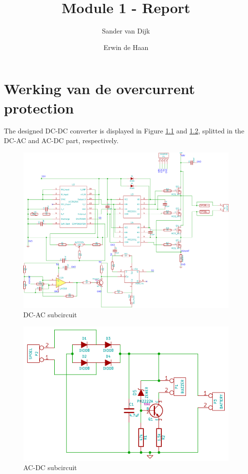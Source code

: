 \documentclass[final]{scrreprt} %
\title{Module 1 - Report}
\author{Sander {van Dijk} \and Erwin {de Haan}}
\begin{document}
\chapter{Werking van de overcurrent protection}
The designed DC-DC converter is displayed in Figure \ref{fig:DC-AC} and \ref{fig:AC-DC}, splitted in the DC-AC and AC-DC part, respectively.

\begin{figure}[h]
	\includegraphics[width=\linewidth]{resources/DC-AC-rc.pdf}
	\caption{DC-AC subcircuit}
	\label{fig:DC-AC}
\end{figure}

\begin{figure}[h]
	\includegraphics[width=\linewidth]{resources/AC-DC-rc.pdf}
	\caption{AC-DC subcircuit}
	\label{fig:AC-DC}
\end{figure}
\end{document}
